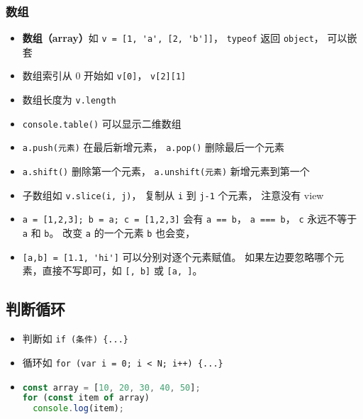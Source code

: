 \subsubsection{数组}
\begin{itemize}
\item \textbf{数组（array）}如 \verb`v = [1, 'a', [2, 'b']]`， \verb`typeof` 返回 \verb`object`， 可以嵌套
\item 数组索引从 0 开始如 \verb`v[0]`， \verb`v[2][1]`
\item 数组长度为 \verb`v.length`
\item \verb`console.table()` 可以显示二维数组
\item \verb`a.push(元素)` 在最后新增元素， \verb`a.pop()` 删除最后一个元素
\item \verb`a.shift()` 删除第一个元素， \verb`a.unshift(元素)` 新增元素到第一个
\item 子数组如 \verb`v.slice(i, j)`， 复制从 \verb`i` 到 \verb`j-1` 个元素， 注意没有 view
\item \verb`a = [1,2,3]; b = a; c = [1,2,3]` 会有 \verb`a == b`， \verb`a === b`， \verb`c` 永远不等于 \verb`a` 和 \verb`b`。 改变 \verb`a` 的一个元素 \verb`b` 也会变， 
\item \verb`[a,b] = [1.1, 'hi']` 可以分别对逐个元素赋值。 如果左边要忽略哪个元素，直接不写即可，如 \verb`[, b]` 或 \verb`[a, ]`。
\end{itemize}

\subsection{判断循环}
\begin{itemize}
\item 判断如 \verb`if (条件) {...}`
\item 循环如 \verb`for (var i = 0; i < N; i++) {...}`
\item 
\begin{lstlisting}[language=js]
const array = [10, 20, 30, 40, 50];
for (const item of array)
  console.log(item);
\end{lstlisting}
\end{itemize}

